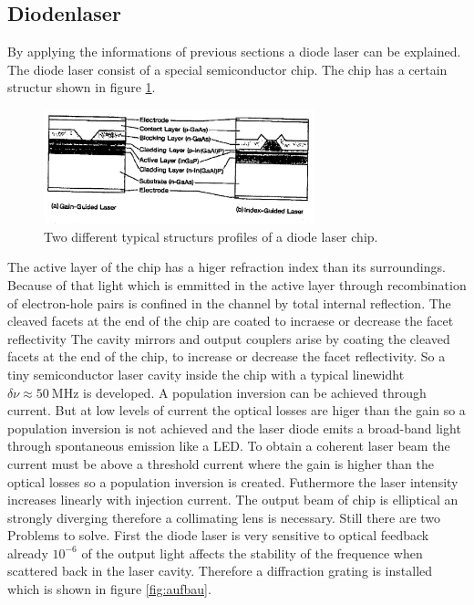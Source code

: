 \subsection{Diodenlaser}
\label{sec:Diodenlaser}
By applying the informations of previous sections
a diode laser can be explained.
The diode laser consist of a special semiconductor chip.
The chip has a certain structur shown in figure \ref{fig:chip}.
\begin{figure}
  \centering
  \includegraphics[width=0.7\textwidth]{chip.png}
  \caption{Two different typical structurs profiles of a diode laser chip.}
  \label{fig:chip}
\end{figure}
The active layer of the chip has a higer refraction index than
its surroundings. Because of that light which is emmitted
in the active layer through recombination of electron-hole pairs
is confined in the channel by total internal reflection.
The cleaved facets at the end of the chip
are coated to incraese or decrease the facet reflectivity
The cavity mirrors and output couplers arise
by coating the cleaved facets at the end of the chip,
to increase or decrease the facet reflectivity.
So a tiny semiconductor laser cavity inside the chip
with a typical linewidht
$\delta \nu \approx \SI{50}{\mega\hertz}$
is developed.
A population inversion
can be achieved through current.
But at low levels of current
the optical losses are higer than the gain
so a population inversion is not achieved and
the laser diode emits a broad-band light
through spontaneous emission
like a LED.
To obtain a coherent laser beam the current must be above
a threshold current where the gain is higher than the
optical losses so a population inversion is created.
Futhermore the laser intensity increases linearly with
injection current.
The output beam of chip is elliptical an strongly diverging
therefore a collimating lens is necessary.
Still there are two Problems to solve.
First the diode laser is very sensitive to optical feedback
already $10^{-6}$ of the output light affects
the stability of the frequence
when scattered back in the
laser cavity.
Therefore a diffraction grating is installed which
is shown in figure \ref{fig:aufbau}.

